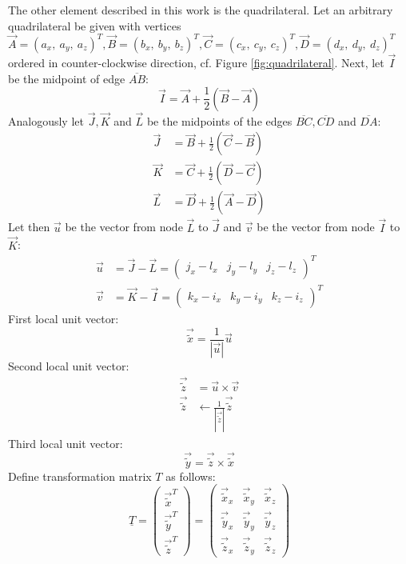   The other element described in this work is the quadrilateral. Let an arbitrary quadrilateral be given with vertices $\vec{A} = (a_x,\ a_y,\ a_z)^T, \vec{B} = (b_x,\ b_y,\ b_z)^T, \vec{C} = (c_x,\ c_y,\ c_z)^T, \vec{D} = (d_x,\ d_y,\ d_z)^T$ ordered in counter-clockwise direction, cf. Figure \ref{fig:quadrilateral}. Next, let $\vec{I}$ be the midpoint of edge $\overline{AB}$:
  \begin{equation*}
   \vec{I} = \vec{A} + \frac{1}{2}\left( \vec{B}-\vec{A}\right)
  \end{equation*}
  Analogously let $\vec{J}, \vec{K}$ and $\vec{L}$ be the midpoints of the edges $\overline{BC}, \overline{CD}$ and $\overline{DA}$:
  \begin{align*}
   \vec{J} &= \vec{B} + \frac{1}{2}\left( \vec{C}-\vec{B}\right) \\
   \vec{K} &= \vec{C} + \frac{1}{2}\left( \vec{D}-\vec{C}\right) \\
   \vec{L} &= \vec{D} + \frac{1}{2}\left( \vec{A}-\vec{D}\right)
  \end{align*}
  Let then $\vec{u}$ be the vector from node $\vec{L}$ to $\vec{J}$ and $\vec{v}$ be the vector from node $\vec{I}$ to $\vec{K}$:
  \begin{align*}
   \vec{u} &= \vec{J}-\vec{L} = \begin{pmatrix}
   j_x-l_x & j_y-l_y & j_z-l_z
   \end{pmatrix}^T\\
   \vec{v} &= \vec{K}-\vec{I} = \begin{pmatrix}
   k_x-i_x & k_y-i_y & k_z-i_z
   \end{pmatrix}^T
  \end{align*}
  First local unit vector:
  \begin{equation*}
   \vec{\tilde{x}} = \frac{1}{\left|\vec{u}\right|}\vec{u}
  \end{equation*}
  Second local unit vector:
  \begin{align*}
   \vec{\tilde{z}} &= \vec{u} \times \vec{v}\\
   \vec{\tilde{z}} &\leftarrow \frac{1}{\left|\vec{\tilde{z}}\right|}\vec{\tilde{z}}
  \end{align*}
  Third local unit vector:
  \begin{equation*}
   \vec{\tilde{y}} = \vec{\tilde{z}} \times \vec{\tilde{x}}
  \end{equation*}
  Define transformation matrix $T$ as follows:
  \begin{equation}\label{eq:trafoT_quad}
   \underline{T} = \begin{pmatrix}
   \vec{\tilde{x}}^T\\ \vec{\tilde{y}}^T\\ \vec{\tilde{z}}^T
   \end{pmatrix} = \begin{pmatrix}
   \vec{\tilde{x}}_x & \vec{\tilde{x}}_y & \vec{\tilde{x}}_z\\ \vec{\tilde{y}}_x & \vec{\tilde{y}}_y & \vec{\tilde{y}}_z\\ \vec{\tilde{z}}_x & \vec{\tilde{z}}_y & \vec{\tilde{z}}_z
   \end{pmatrix}
  \end{equation}
